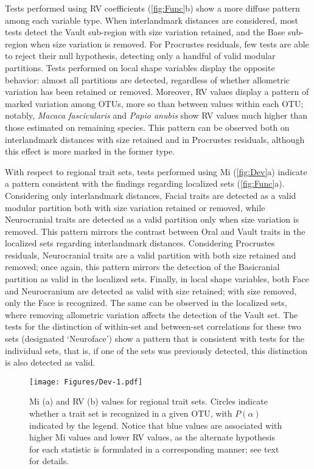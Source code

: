 \documentclass[12pt,]{article}
\begin{document}
Tests performed using RV coefficients (\autoref{fig:Func}b) show a more
diffuse pattern among each variable type. When interlandmark distances
are considered, most tests detect the Vault sub-region with size
variation retained, and the Base sub-region when size variation is
removed. For Procrustes residuals, few tests are able to reject their
null hypothesis, detecting only a handful of valid modular partitions.
Tests performed on local shape variables display the opposite behavior:
almost all partitions are detected, regardless of whether allometric
variation has been retained or removed. Moreover, RV values display a
pattern of marked variation among OTUs, more so than between values
within each OTU; notably, \emph{Macaca fascicularis} and \emph{Papio
anubis} show RV values much higher than those estimated on remaining
species. This pattern can be observed both on interlandmark distances
with size retained and in Procrustes residuals, although this effect is
more marked in the former type.

With respect to regional trait sets, tests performed using Mi
(\autoref{fig:Dev}a) indicate a pattern consistent with the findings
regarding localized sets (\autoref{fig:Func}a). Considering only
interlandmark distances, Facial traits are detected as a valid modular
partition both with size variation retained or removed, while
Neurocranial traits are detected as a valid partition only when size
variation is removed. This pattern mirrors the contrast between Oral and
Vault traits in the localized sets regarding interlandmark distances.
Considering Procrustes residuals, Neurocranial traits are a valid
partition with both size retained and removed; once again, this pattern
mirrors the detection of the Basicranial partition as valid in the
localized sets. Finally, in local shape variables, both Face and
Neurocranium are detected as valid with size retained; with size
removed, only the Face is recognized. The same can be observed in the
localized sets, where removing allometric variation affects the
detection of the Vault set. The tests for the distinction of within-set
and between-set correlations for these two sets (designated `Neuroface')
show a pattern that is consistent with tests for the individual sets,
that is, if one of the sets was previously detected, this distinction is
also detected as valid.

\begin{figure}[htbp]
\centering
\texttt{[image: Figures/Dev-1.pdf]}
\caption{Mi (a) and RV (b) values for regional trait sets. Circles
indicate whether a trait set is recognized in a given OTU, with
$P(\alpha)$ indicated by the legend. Notice that blue values are
associated with higher Mi values and lower RV values, as the alternate
hypothesis for each statistic is formulated in a corresponding manner;
see text for details. \label{fig:Dev}}
\end{figure}
\end{document}
